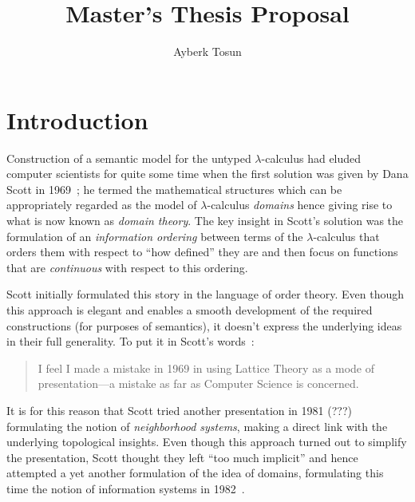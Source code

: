 \documentclass[11pt]{article}
\title{Master's Thesis Proposal}
\author{Ayberk Tosun}
\begin{document}
\maketitle

\section{Introduction}

Construction of a semantic model for the untyped $\lambda$-calculus had eluded computer
scientists for quite some time when the first solution was given by Dana Scott in
1969~\cite{scott:1969}; he termed the mathematical structures which can be appropriately
regarded as the model of $\lambda$-calculus \emph{domains} hence giving rise to what is now
known as \emph{domain theory}. The key insight in Scott's solution was the formulation of
an \emph{information ordering} between terms of the $\lambda$-calculus that orders them with
respect to ``how defined'' they are and then focus on functions that are \emph{continuous}
with respect to this ordering.

Scott initially formulated this story in the language of order theory. Even though this
approach is elegant and enables a smooth development of the required constructions (for
purposes of semantics), it doesn't express the underlying ideas in their full generality.
To put it in Scott's words~\cite[pg.~577]{scott:1982}:

\begin{quote}
  I feel I made a mistake in 1969 in using Lattice Theory as a mode of
  presentation---a mistake as far as Computer Science is concerned.
\end{quote}

It is for this reason that Scott tried another presentation in 1981 (???) formulating the
notion of \emph{neighborhood systems}, making a direct link with the underlying
topological insights. Even though this approach turned out to simplify the presentation,
Scott thought they left ``too much implicit'' and hence attempted a yet another
formulation of the idea of domains, formulating this time the notion of information
systems in 1982~\cite{scott:1982}.



\end{document}
